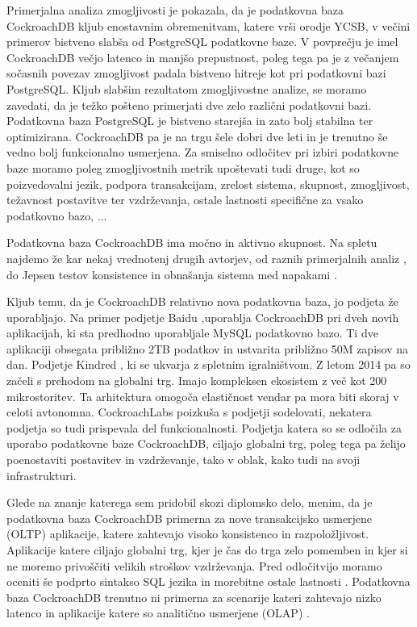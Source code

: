 \documentclass[a4paper, 12pt]{book}
\begin{document}
Primerjalna analiza zmogljivosti je pokazala, da je podatkovna baza Cock\-roachDB kljub enostavnim obremenitvam, katere vrši orodje YCSB, v večini primerov bistveno slabša od PostgreSQL podatkovne baze. V povprečju je imel Cock\-roachDB večjo latenco in manjšo prepustnost, poleg tega pa je z večanjem sočasnih povezav zmogljivost padala bistveno hitreje kot pri podatkovni bazi PostgreSQL. Kljub slabšim rezultatom zmogljivostne analize, se moramo zavedati, da je težko pošteno primerjati dve zelo različni podatkovni bazi. Podatkovna baza PostgreSQL je bistveno starejša in zato bolj stabilna ter optimizirana. CockroachDB pa je na trgu šele dobri dve leti in je trenutno še vedno bolj funkcionalno usmerjena. Za smiselno odločitev pri izbiri podatkovne baze moramo poleg zmogljivostnih metrik upoštevati tudi druge, kot so poizvedovalni jezik, podpora transakcijam, zrelost sistema, skupnost, zmogljivost, težavnost postavitve ter vzdrževanja, ostale lastnosti specifične za vsako podatkovno bazo, ...

Podatkovna baza CockroachDB ima močno in aktivno skupnost. Na spletu najdemo že kar nekaj vrednotenj drugih avtorjev, od raznih primerjalnih analiz \cite{kaur2017performance, Benchmarking-GCS-CRDB-NuoDB, CRDB-tpcc-vs-aurora, CRDB-2017}, do Jepsen testov konsistence in obnašanja sistema med napakami \cite{CRDB-jepsen, CRDB-jepsen-diy}.

Kljub temu, da je CockroachDB relativno nova podatkovna baza, jo podjeta že uporabljajo. Na primer podjetje Baidu \cite{crdb-baidu},uporablja CockroachDB pri dveh novih aplikacijah, ki sta predhodno uporabljale MySQL podatkovno bazo. Ti dve aplikaciji obsegata približno 2TB podatkov in ustvarita približno 50M zapisov na dan. Podjetje Kindred \cite{crdb-kindred}, ki se ukvarja z spletnim igralništvom. Z letom 2014 pa so začeli s prehodom na globalni trg. Imajo kompleksen ekosistem z več kot 200 mikrostoritev. Ta arhitektura omogoča elastičnost vendar pa mora biti skoraj v celoti avtonomna. CockroachLabs poizkuša s podjetji sodelovati, nekatera podjetja so tudi prispevala del funkcionalnosti. Podjetja katera so se odločila za uporabo podatkovne baze CockroachDB, ciljajo globalni trg, poleg tega pa želijo poenostaviti postavitev in vzdrževanje, tako v oblak, kako tudi na svoji infrastrukturi.

Glede na znanje katerega sem pridobil skozi diplomsko delo, menim, da je podatkovna baza CockroachDB primerna za nove transakcijsko usmerjene (OLTP) aplikacije, katere zahtevajo visoko konsistenco in razpoložljivost. Aplikacije katere ciljajo globalni trg, kjer je čas do trga zelo pomemben in kjer si ne moremo privoščiti velikih stroškov vzdrževanja. Pred odločitvijo moramo oceniti še podprto sintakso SQL jezika \cite{CRDB-sql-features} in morebitne ostale lastnosti \cite{CRDB-limitations}. Podatkovna baza CockroachDB trenutno ni primerna za scenarije kateri zahtevajo nizko latenco in aplikacije katere so analitično usmerjene (OLAP) \cite{CRDB-FAQ}.
\end{document}
